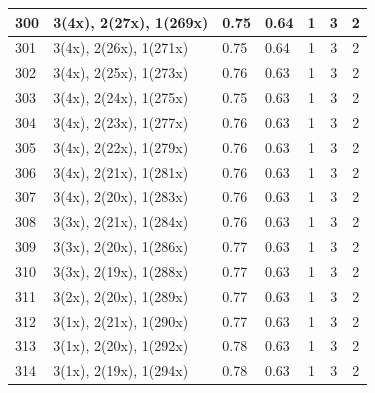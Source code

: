 \begin{small}
\begin{longtable}{|p{0.5cm}|p{9cm}|p{1.3cm}|p{1.3cm}|c|c|c|}
  300 & 3(4x), 2(27x), 1(269x) & \cellcolor{colorBad}  0.75 & \cellcolor{colorBad} 0.64 & 1 & 3 & \cellcolor{colorGood} 2 \\   \hline
  301 & 3(4x), 2(26x), 1(271x) & \cellcolor{colorBad}  0.75 & \cellcolor{colorBad} 0.64 & 1 & 3 & \cellcolor{colorGood} 2 \\   \hline
  302 & 3(4x), 2(25x), 1(273x) & \cellcolor{colorBad}  0.76 & \cellcolor{colorBad} 0.63 & 1 & 3 & \cellcolor{colorGood} 2 \\   \hline
  303 & 3(4x), 2(24x), 1(275x) & \cellcolor{colorBad}  0.75 & \cellcolor{colorBad} 0.63 & 1 & 3 & \cellcolor{colorGood} 2 \\   \hline
  304 & 3(4x), 2(23x), 1(277x) & \cellcolor{colorBad}  0.76 & \cellcolor{colorBad} 0.63 & 1 & 3 & \cellcolor{colorGood} 2 \\   \hline
  305 & 3(4x), 2(22x), 1(279x) & \cellcolor{colorBad}  0.76 & \cellcolor{colorBad} 0.63 & 1 & 3 & \cellcolor{colorGood} 2 \\   \hline
  306 & 3(4x), 2(21x), 1(281x) & \cellcolor{colorBad}  0.76 & \cellcolor{colorBad} 0.63 & 1 & 3 & \cellcolor{colorGood} 2 \\   \hline
  307 & 3(4x), 2(20x), 1(283x) & \cellcolor{colorBad}  0.76 & \cellcolor{colorBad} 0.63 & 1 & 3 & \cellcolor{colorGood} 2 \\   \hline
  308 & 3(3x), 2(21x), 1(284x) & \cellcolor{colorBad}  0.76 & \cellcolor{colorBad} 0.63 & 1 & 3 & \cellcolor{colorGood} 2 \\   \hline
  309 & 3(3x), 2(20x), 1(286x) & \cellcolor{colorBad}  0.77 & \cellcolor{colorBad} 0.63 & 1 & 3 & \cellcolor{colorGood} 2 \\   \hline
  310 & 3(3x), 2(19x), 1(288x) & \cellcolor{colorBad}  0.77 & \cellcolor{colorBad} 0.63 & 1 & 3 & \cellcolor{colorGood} 2 \\   \hline
  311 & 3(2x), 2(20x), 1(289x) & \cellcolor{colorBad}  0.77 & \cellcolor{colorBad} 0.63 & 1 & 3 & \cellcolor{colorGood} 2 \\   \hline
  312 & 3(1x), 2(21x), 1(290x) & \cellcolor{colorBad}  0.77 & \cellcolor{colorBad} 0.63 & 1 & 3 & \cellcolor{colorGood} 2 \\   \hline
  313 & 3(1x), 2(20x), 1(292x) & \cellcolor{colorBad}  0.78 & \cellcolor{colorBad} 0.63 & 1 & 3 & \cellcolor{colorGood} 2 \\   \hline
  314 & 3(1x), 2(19x), 1(294x) & \cellcolor{colorBad}  0.78 & \cellcolor{colorBad} 0.63 & 1 & 3 & \cellcolor{colorGood} 2 \\   \hline

\end{longtable}
\end{small}

